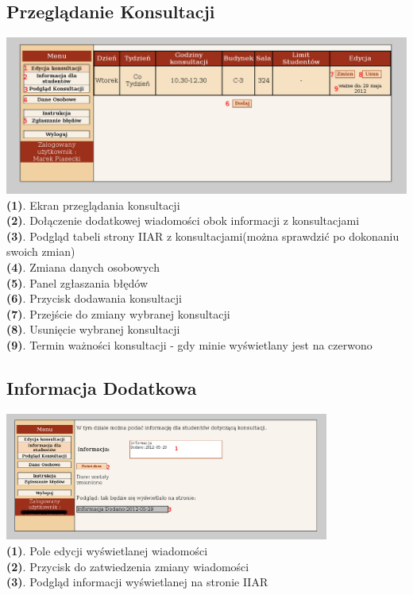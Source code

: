 \documentclass[12pt]{article} %
\begin{document}
\subsection{Przeglądanie Konsultacji}
\includegraphics[width=1\textwidth]{instr3.png}
\textbf {(1)}. Ekran przeglądania konsultacji \\
\textbf {(2)}. Dołączenie dodatkowej wiadomości obok informacji z konsultacjami \\
\textbf {(3)}. Podgląd tabeli strony IIAR z konsultacjami(można sprawdzić po
dokonaniu swoich zmian)
\\
\textbf {(4)}. Zmiana danych osobowych \\
\textbf {(5)}. Panel zgłaszania błędów \\
\textbf {(6)}. Przycisk dodawania konsultacji\\
\textbf {(7)}. Przejście do zmiany wybranej konsultacji\\
\textbf {(8)}. Usunięcie wybranej konsultacji\\
\textbf {(9)}. Termin ważności konsultacji - gdy minie wyświetlany jest na
czerwono\\


\subsection{Informacja Dodatkowa}
\includegraphics[width=0.8\textwidth]{instr4.png}\\
\textbf {(1)}. Pole edycji wyświetlanej wiadomości\\
\textbf {(2)}. Przycisk do zatwiedzenia zmiany wiadomości\\
\textbf {(3)}. Podgląd informacji wyświetlanej na stronie IIAR
\end{document}
